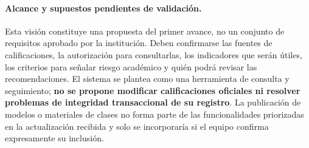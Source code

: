 \paragraph{Alcance y supuestos pendientes de validación.}
Esta visión constituye una propuesta del primer avance, no un conjunto de requisitos aprobado por la institución. Deben confirmarse las fuentes de calificaciones, la autorización para consultarlas, los indicadores que serán útiles, los criterios para señalar riesgo académico y quién podrá revisar las recomendaciones. El sistema se plantea como una herramienta de consulta y seguimiento; \textbf{no se propone modificar calificaciones oficiales ni resolver problemas de integridad transaccional de su registro}. La publicación de modelos o materiales de clases no forma parte de las funcionalidades priorizadas en la actualización recibida y solo se incorporaría si el equipo confirma expresamente su inclusión.
